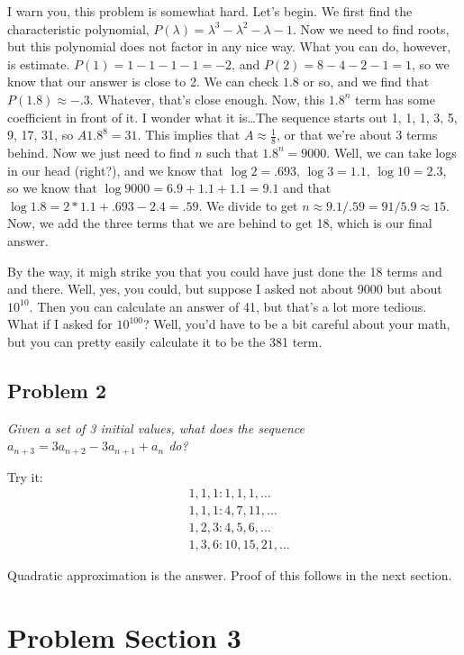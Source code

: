 \documentclass[12pt,letterpaper]{article}
\begin{document}
I warn you, this problem is somewhat hard. Let's begin. We first find the
characteristic polynomial, $P(\lambda) = \lambda^3 - \lambda^2 - \lambda - 1$. Now we need
to find roots, but this polynomial does not factor in any nice way. What you
can do, however, is estimate. $P(1) = 1 - 1 - 1 - 1 = -2$, and $P(2) = 8 - 4 - 2 - 1 = 1$,
so we know that our answer is close to 2. We can check $1.8$ or so, and we find
that $P(1.8)\approx-.3$. Whatever, that's close enough. Now, this $1.8^n$
term has some coefficient in front of it. I wonder what it is\dots The sequence
starts out 1, 1, 1, 3, 5, 9, 17, 31, so $A 1.8^8 = 31$. This implies that
$A\approx\frac18$, or that we're about 3 terms behind. Now we just need to find
$n$ such that $1.8^n=9000$. Well, we can take logs in our head (right?), and
we know that $\log 2 = .693$, $\log 3 = 1.1$, $\log 10 = 2.3$, so we know that
$\log 9000 = 6.9 + 1.1 + 1.1 = 9.1$ and that $\log 1.8 = 2*1.1 + .693 - 2.4 = .59$.
We divide to get $n \approx 9.1/.59 = 91/5.9 \approx 15$. Now, we add the three
terms that we are behind to get 18, which is our final answer.

By the way, it migh strike you that you could have just done the 18 terms and
and there. Well, yes, you could, but suppose I asked not about 9000 but about
$10^{10}$. Then you can calculate an answer of 41, but that's a lot more tedious.
What if I asked for $10^{100}$? Well, you'd have to be a bit careful about your
math, but you can pretty easily calculate it to be the 381 term.

\subsection{Problem 2}
\emph{Given a set of 3 initial values, what does the sequence $a_{n+3} =
  3a_{n+2} - 3a_{n+1} + a_n$ do?}

Try it:
\begin{align*}
&1, 1, 1: 1, 1, 1, \dots \\
&1, 1, 1: 4, 7, 11, \dots \\
&1, 2, 3: 4, 5, 6, \dots \\
&1, 3, 6: 10, 15, 21, \dots
\end{align*}

Quadratic approximation is the answer. Proof of this follows in the next section.

\pagebreak
\section{Problem Section 3}
\end{document}
